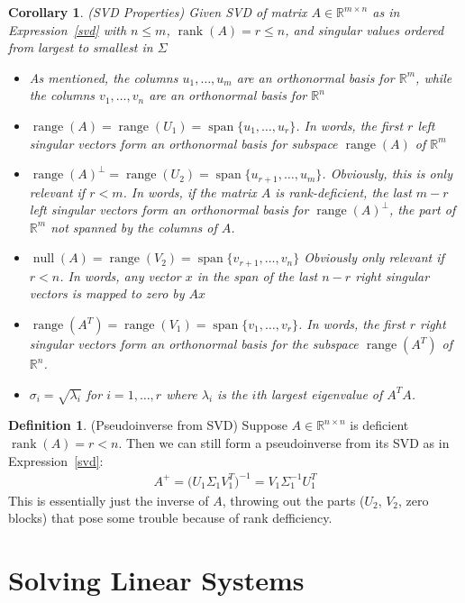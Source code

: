 \documentclass[12pt]{book}
\numberwithin{equation}{section} %
\theoremstyle{plain}
\newtheorem{cor}[thm]{Corollary}
\theoremstyle{definition}
\newtheorem{defn}[thm]{Definition}
\theoremstyle{remark}
\newcommand{\Rn}{\mathbb{R}^n}
\newcommand{\Rm}{\mathbb{R}^m}
\newcommand{\Rmn}{\mathbb{R}^{m\times n}}
\newcommand{\Rnn}{\mathbb{R}^{n\times n}}
\newcommand{\nul}{\operatorname{null}}
\newcommand{\range}{\operatorname{range}}
\newcommand{\rank}{\operatorname{rank}}
\newcommand{\spann}{\operatorname{span}}
\begin{document}
\begin{cor}\emph{(SVD Properties)}
Given SVD of matrix $A\in\Rmn$ as in Expression~\ref{svd} with $n\leq
m$, $\rank(A)=r\leq n$, and singular values ordered from largest to
smallest in $\Sigma$
\begin{itemize}
  \item As mentioned, the columns $u_1,\ldots,u_m$ are an orthonormal
    basis for $\Rm$, while the columns $v_1,\ldots,v_n$ are an
    orthonormal basis for $\Rn$
  \item $\range(A)=\range(U_1)=\spann\{u_{1},\ldots,u_r\}$. In words,
    the first $r$ left singular vectors form an orthonormal basis for
    subspace $\range(A)$ of $\Rm$
  \item
    $\range(A)^\perp=\range(U_2)=\spann\{u_{r+1},\ldots,u_m\}$.
    Obviously, this is only relevant if $r<m$.
    In words, if the matrix $A$ is rank-deficient, the last $m-r$ left
    singular vectors form an orthonormal basis for $\range(A)^\perp$,
    the part of $\Rm$ \emph{not} spanned by the columns of $A$.
  \item $\nul(A)=\range(V_2)=\spann\{v_{r+1},\ldots,v_n\}$
    Obviously only relevant if $r<n$.
    In words, any vector $x$ in the span of the last $n-r$ right
    singular vectors is mapped to zero by $Ax$
  \item $\range(A^T)=\range(V_1)=\spann\{v_1,\ldots,v_r\}$.
    In words, the first $r$ right singular vectors form an orthonormal
    basis for the subspace $\range(A^T)$ of $\Rn$.
  \item $\sigma_i = \sqrt{\lambda_i}$ for $i=1,\ldots,r$ where
    $\lambda_i$ is the $i$th largest eigenvalue of $A^TA$.
\end{itemize}
\end{cor}

\begin{defn}(Pseudoinverse from SVD)
Suppose $A\in\Rnn$ is deficient $\rank(A)=r<n$. Then we can
still form a pseudoinverse from its SVD as in Expression~\ref{svd}:
\begin{align*}
  A^+ =
  \big(
  U_1\Sigma_1 V^T_1
  \big)^{-1}
  =
  V_1\Sigma_1^{-1}U_1^T
\end{align*}
This is essentially just the inverse of $A$, throwing out the parts
($U_2$, $V_2$, zero blocks) that pose some trouble because of rank
defficiency.
\end{defn}



\clearpage
\section{Solving Linear Systems}
\end{document}
